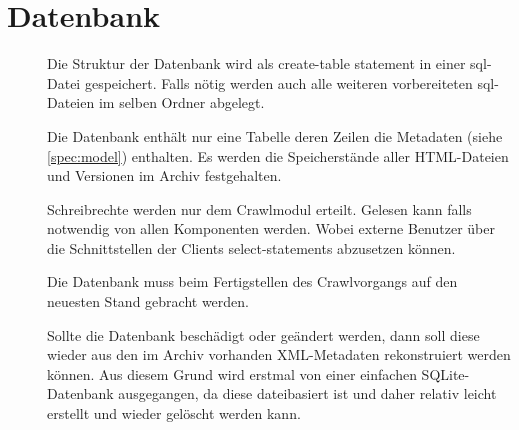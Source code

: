 \section{Datenbank} \label{spec:db}
\begin{description}
	\item []
		Die Struktur der Datenbank wird als create-table statement in einer sql-Datei gespeichert.
		Falls nötig werden auch alle weiteren vorbereiteten sql-Dateien im selben Ordner abgelegt.
	\item []
		Die Datenbank enthält nur eine Tabelle deren Zeilen die Metadaten 
		(siehe \ref{spec:model}) enthalten. 
		Es werden die Speicherstände aller HTML-Dateien und Versionen im Archiv festgehalten.
	\item []
		Schreibrechte werden nur dem Crawlmodul erteilt.
		Gelesen kann falls notwendig von allen Komponenten werden.
		Wobei externe Benutzer über die Schnittstellen der Clients select-statements abzusetzen können.
	\item []
		Die Datenbank muss beim Fertigstellen des Crawlvorgangs auf den neuesten Stand gebracht werden.
	\item []
		Sollte die Datenbank beschädigt oder geändert werden, dann soll diese wieder aus den
		im Archiv vorhanden XML-Metadaten rekonstruiert werden können.
		Aus diesem Grund wird erstmal von einer einfachen SQLite-Datenbank ausgegangen, 
		da diese dateibasiert ist und daher relativ leicht erstellt und wieder gelöscht werden kann.
\end{description}
